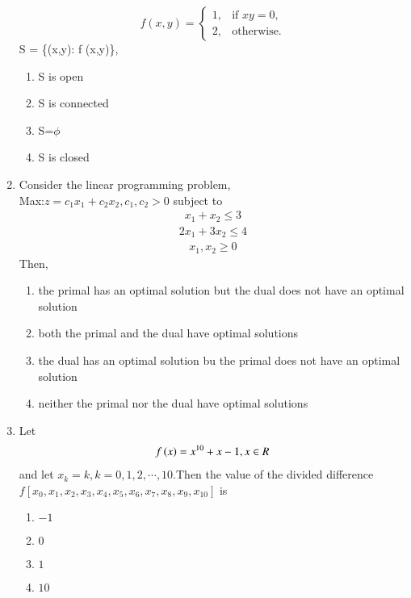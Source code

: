 \documentclass[journal,12pt,twocolumn]{IEEEtran}
\theoremstyle{remark}
\begin{document}
\begin{enumerate}
\[
f(x,y) = \begin{cases}
1, & \text{if } xy = 0, \\
2, & \text{otherwise.}
\end{cases}
\]
 S = \{(x,y): f  (x,y)\}, 
\begin{multicols}{2}
\begin{enumerate}
    \item S is open
    \item S is connected 
    \item S=$\phi$
    \item S is closed 
\end{enumerate}    
\end{multicols}
\item Consider the linear programming problem,\\Max:$z=c_1x_1+c_2x_2,c_1,c_2>0$ subject to
\begin{align*}
    x_1+x_2 \leq 3
\end{align*}
\begin{align*}
    2x_1+3x_2 \leq 4
\end{align*}
\begin{align*}
    x_1,x_2\geq 0
\end{align*}
Then,
\begin{enumerate}
    \item the primal has an optimal solution but the dual does not have an optimal solution
    \item both the primal and the dual have optimal solutions 
    \item the dual has an optimal solution bu the primal does not have an optimal solution
    \item neither the primal nor the dual have optimal solutions
\end{enumerate}    
\item Let 
\begin{align*}
    f\left(x\right)=x^{10}+x-1,x \in R
\end{align*}
and let $x_k=k, k=0,1,2,\cdots,10$.Then the value of the divided difference \\$f[x_0,x_1,x_2,x_3,x_4,x_5,x_6,x_7,x_8,x_9,x_{10}]$ is 
\begin{multicols}{2}
\begin{enumerate}
  \item $-1$
    \item $0$
    \item $1$
    \item $10$

\end{enumerate}
\end{multicols}
\end{enumerate}
\end{document}
